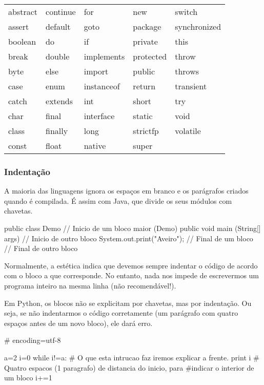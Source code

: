 \documentclass[11pt,openright,twoside]{report}
\begin{document}
\begin{table}[H]
\begin{tabular}{lllll}
abstract & continue & for        & new       & switch       \\
assert   & default  & goto       & package   & synchronized \\
boolean  & do       & if         & private   & this         \\
break    & double   & implements & protected & throw        \\
byte     & else     & import     & public    & throws       \\
case     & enum     & instanceof & return    & transient    \\
catch    & extends  & int        & short     & try          \\
char     & final    & interface  & static    & void         \\
class    & finally  & long       & strictfp  & volatile     \\
const    & float    & native     & super     &             
\end{tabular}
\end{table}
\medskip

\subsubsection{Indentação}
A maioria das linguagens ignora os espaços em branco e os parágrafos criados quando é compilada. É assim com Java, que divide os seus módulos com chavetas.
\begin{Java}
public class Demo{								// Inicio de um bloco maior (Demo)
	public void main (String[] args){			// Inicio de outro bloco
		System.out.print("Aveiro");
	}											// Final de um bloco
}												// Final de outro bloco
\end{Java}
\smallskip

Normalmente, a estética indica que devemos sempre indentar o código de acordo com o bloco a que corresponde. No entanto, nada nos impede de escrevermos um programa inteiro na mesma linha (não recomendável!).
\smallskip

Em Python, os blocos não se explicitam por chavetas, mas por indentação. Ou seja, se não indentarmos o código corretamente (um parágrafo com quatro espaços antes de um novo bloco), ele dará erro.

\begin{Python}
# encoding=utf-8

a=2
i=0
while i!=a:		# O que esta intrucao faz iremos explicar a frente.
	print i 		# Quatro espacos (1 paragrafo) de distancia do inicio, para #indicar o interior de um bloco
	i+=1
\end{Python}
\medskip
\end{document}
